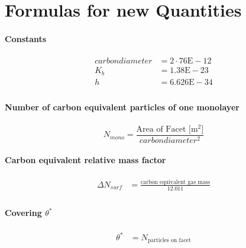 
\chapter{Formulas for new Quantities}\label{chapter:Formulas}

\subsubsection*{Constants}
\begin{equation}
	\begin{split}
	carbondiameter&=2 \cdot 76\text{E}-12\\
	K_b&=1.38\text{E}-23\\
	h&=6.626\text{E}-34\\
	\end{split}
\end{equation}

\subsubsection*{Number of carbon equivalent particles of one monolayer}
\begin{equation}
	\label{eq:nmono}
	N_{mono}=\frac{\text{Area of Facet [m$^2$]}}{carbondiameter^2}
\end{equation}

\subsubsection*{Carbon equivalent relative mass factor}
\begin{equation}
	\label{eq:nsurf}
	\begin{split}
	\Delta N_{surf}&=\frac{\text{carbon equivalent gas mass}}{12.011}\\
	\end{split}
\end{equation}

\subsubsection*{Covering $\theta^*$}
\begin{equation}
	\begin{split}
		\theta^*&=N_{\text{particles on facet}}
	\end{split}
\end{equation}

